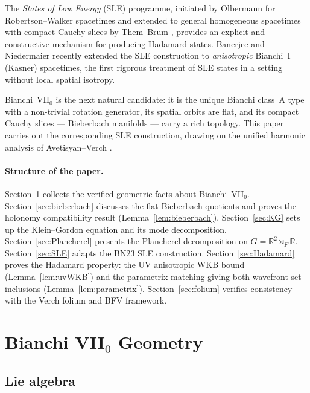 \documentclass[12pt, a4paper]{article}
\theoremstyle{remark}
\newcommand{\bR}{\mathbb{R}}
\newcommand{\semidp}{\rtimes}
\begin{document}
The \emph{States of Low Energy} (SLE) programme, initiated by Olbermann
\cite{Olb07} for Robertson--Walker spacetimes and extended to general
homogeneous spacetimes with compact Cauchy slices by Them--Brum
\cite{TB13}, provides an explicit and constructive mechanism for producing
Hadamard states.
Banerjee and Niedermaier \cite{BN23} recently extended the SLE
construction to \emph{anisotropic} Bianchi~I (Kasner) spacetimes, the
first rigorous treatment of SLE states in a setting without local spatial
isotropy.

Bianchi~VII$_0$ is the next natural candidate: it is the unique Bianchi
class~A type with a non-trivial rotation generator, its spatial orbits are
flat, and its compact Cauchy slices --- Bieberbach manifolds --- carry a
rich topology.
This paper carries out the corresponding SLE construction, drawing on the
unified harmonic analysis of Avetisyan--Verch \cite{AV13}.

\paragraph{Structure of the paper.}
Section~\ref{sec:VII0} collects the verified geometric facts about
Bianchi~VII$_0$.
Section~\ref{sec:bieberbach} discusses the flat Bieberbach quotients and
proves the holonomy compatibility result (Lemma~\ref{lem:bieberbach}).
Section~\ref{sec:KG} sets up the Klein--Gordon equation and its mode
decomposition.
Section~\ref{sec:Plancherel} presents the Plancherel decomposition on
$G = \bR^2 \semidp_F \bR$.
Section~\ref{sec:SLE} adapts the BN23 SLE construction.
Section~\ref{sec:Hadamard} proves the Hadamard property: the UV
anisotropic WKB bound (Lemma~\ref{lem:uvWKB}) and the parametrix matching
giving both wavefront-set inclusions (Lemma~\ref{lem:parametrix}).
Section~\ref{sec:folium} verifies consistency with the Verch folium and
BFV framework.

\section{Bianchi VII$_0$ Geometry}\label{sec:VII0}

\subsection{Lie algebra}
\end{document}
